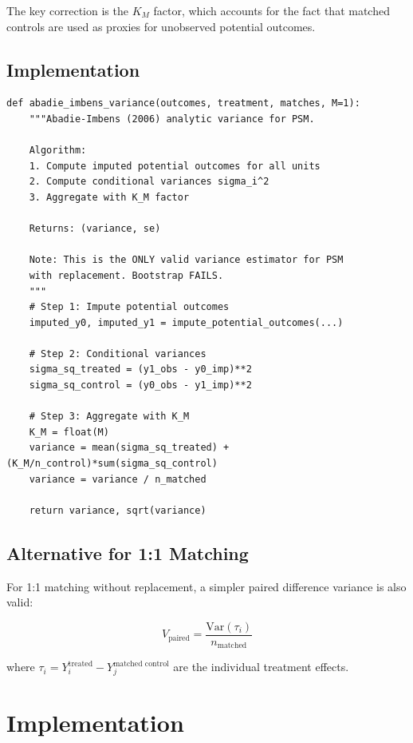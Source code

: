 The key correction is the $K_M$ factor, which accounts for the fact that matched controls are used as proxies for unobserved potential outcomes.

\subsection{Implementation}

\begin{verbatim}
def abadie_imbens_variance(outcomes, treatment, matches, M=1):
    """Abadie-Imbens (2006) analytic variance for PSM.

    Algorithm:
    1. Compute imputed potential outcomes for all units
    2. Compute conditional variances sigma_i^2
    3. Aggregate with K_M factor

    Returns: (variance, se)

    Note: This is the ONLY valid variance estimator for PSM
    with replacement. Bootstrap FAILS.
    """
    # Step 1: Impute potential outcomes
    imputed_y0, imputed_y1 = impute_potential_outcomes(...)

    # Step 2: Conditional variances
    sigma_sq_treated = (y1_obs - y0_imp)**2
    sigma_sq_control = (y0_obs - y1_imp)**2

    # Step 3: Aggregate with K_M
    K_M = float(M)
    variance = mean(sigma_sq_treated) + (K_M/n_control)*sum(sigma_sq_control)
    variance = variance / n_matched

    return variance, sqrt(variance)
\end{verbatim}

\subsection{Alternative for 1:1 Matching}

For 1:1 matching without replacement, a simpler paired difference variance is also valid:

\begin{equation}
V_{\text{paired}} = \frac{\text{Var}(\tau_i)}{n_{\text{matched}}}
\label{eq:paired_var}
\end{equation}

where $\tau_i = Y_i^{\text{treated}} - Y_j^{\text{matched control}}$ are the individual treatment effects.


\section{Implementation}
\label{sec:psm_implementation}

